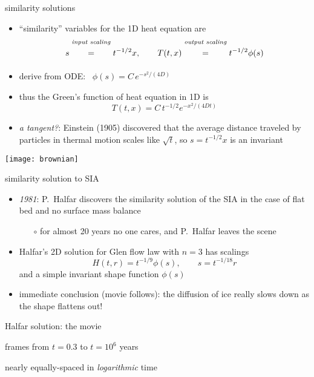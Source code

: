 \begin{frame}{similarity solutions}

\begin{itemize}
\item ``similarity'' variables for the 1D heat equation are
	$$s \stackrel{\text{\emph{input scaling}}}{\phantom{\Big|}=\phantom{\Big|}} t^{-1/2} x, \qquad T(t,x) \stackrel{\text{\emph{output scaling}}}{\phantom{\Big|}=\phantom{\Big|}} t^{-1/2} \phi(s)$$
\item derive from ODE: \, $\phi(s) = C\, e^{-s^2/(4D)}$
\item thus the Green's function of heat equation in 1D is
	$$T(t,x) = C\, t^{-1/2} e^{-x^2/(4Dt)}$$

\bigskip
\item \begin{minipage}[t]{0.55\textwidth}
\noindent \emph{a tangent?}: Einstein (1905) discovered that the average distance traveled by particles in thermal motion scales like $\sqrt{t}$, so $s = t^{-1/2}x$ is an invariant
\end{minipage}
\end{itemize}

\vspace{-20mm}
\hfill \texttt{[image: brownian]}
\end{frame}


\begin{frame}{similarity solution to SIA}

\begin{itemize}
\item \emph{1981}:  P.~Halfar discovers the similarity solution of the SIA in the case of flat bed and no surface mass balance
  \begin{itemize}
  \item[$\circ$] for almost 20 years no one cares, and P.~Halfar leaves the scene
  \end{itemize}
\item Halfar's 2D solution for Glen flow law with $n=3$ has scalings
   $$H(t,r)=t^{-1/9} \phi(s), \qquad s = t^{-1/18} r$$
and a simple invariant shape function $\phi(s)$

\medskip
\item immediate conclusion (\alert{movie follows}): the diffusion of ice really slows down as the shape flattens out!
\end{itemize}
\end{frame}


\begin{frame}{Halfar solution: the movie}
\label{slide:plothalfar}

\medskip
\small
frames from $t=0.3$ to $t = 10^6$ years

\medskip
nearly equally-spaced in \emph{logarithmic} time

\begin{center}
\end{center}
\end{frame}


